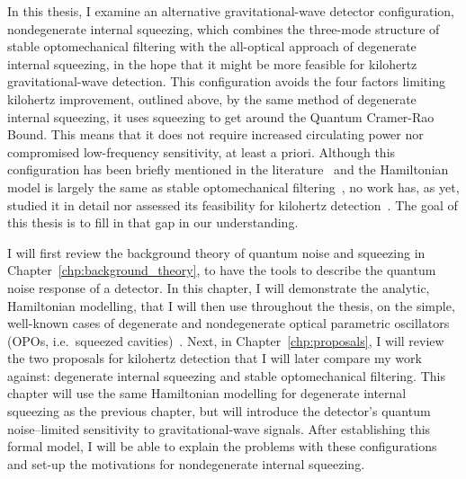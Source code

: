 In this thesis, I examine an alternative gravitational-wave detector configuration, nondegenerate internal squeezing, which combines the three-mode structure of stable optomechanical filtering with the all-optical approach of degenerate internal squeezing, in the hope that it might be more feasible for kilohertz gravitational-wave detection. This configuration avoids the four factors limiting kilohertz improvement, outlined above, by the same method of degenerate internal squeezing, it uses squeezing to get around the Quantum Cramer-Rao Bound. This means that it does not require increased circulating power nor compromised low-frequency sensitivity, at least a priori. Although this configuration has been briefly mentioned in the literature~\cite{liBroadbandSensitivityImprovement2020} and the Hamiltonian model is largely the same as stable optomechanical filtering~\cite{liBroadbandSensitivityImprovement2020}, no work has, as yet, studied it in detail nor assessed its feasibility for kilohertz detection~\cite{}. The goal of this thesis is to fill in that gap in our understanding.

I will first review the background theory of quantum noise and squeezing in Chapter~\ref{chp:background_theory}, to have the tools to describe the quantum noise response of a detector. In this chapter, I will demonstrate the analytic, Hamiltonian modelling, that I will then use throughout the thesis, on the simple, well-known cases of degenerate and nondegenerate optical parametric oscillators (OPOs, i.e.\ squeezed cavities)~\cite{}. Next, in Chapter~\ref{chp:proposals}, I will review the two proposals for kilohertz detection that I will later compare my work against: degenerate internal squeezing and stable optomechanical filtering. This chapter will use the same Hamiltonian modelling for degenerate internal squeezing as the previous chapter, but will introduce the detector's quantum noise--limited sensitivity to gravitational-wave signals. After establishing this formal model, I will be able to explain the problems with these configurations and set-up the motivations for nondegenerate internal squeezing.

